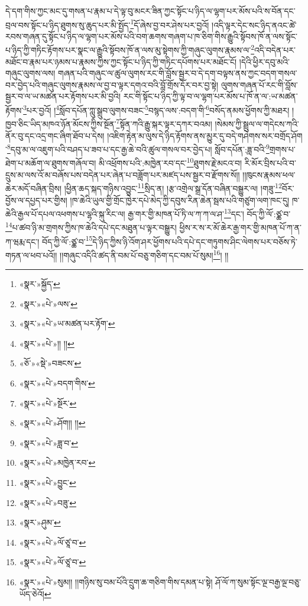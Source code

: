 དེ་དག་གིས་ཀྱང་མང་དུ་གསན་པ་རྣམ་པ་དེ་ལྟ་བུ་མངར་ཟིན་ཀྱང་སྟོང་པ་ཉིད་ལ་ལྷག་པར་མོས་པའི་ས་བོན་དང་བྲལ་བས་སྟོང་པ་ཉིད་ཐུགས་སུ་ཆུད་པར་མི་སྤྱོད་\footnote{«སྣར་»སྐྱོད་}དོ་ཞེས་བྱ་བར་ཤེས་པར་བྱའོ། །འདི་ལྟར་དེང་སང་ཉིད་ནའང་ཚེ་རབས་གཞན་དུ་སྟོང་པ་ཉིད་ལ་ལྷག་པར་མོས་པའི་བག་ཆགས་གཞག་པ་ཁ་ཅིག་གིས་རྒྱུའི་སྟོབས་ཁོ་ན་ལས་སྟོང་པ་ཉིད་ཀྱི་གཏིང་རྟོགས་པར་སྣང་ལ་རྒྱུའི་སྟོབས་ཁོ་ན་ལས་མུ་སྟེགས་ཀྱི་གཞུང་ལུགས་རྣམས་ལ་\footnote{«སྣར་»«པེ་»ལས་}འདི་བདེན་པར་མཐོང་བ་རྣམ་པར་ཉམས་པ་རྣམས་ཀྱིས་ཀྱང་སྟོང་པ་ཉིད་ཀྱི་གཏིང་དཔོགས་པར་མཐོང་ངོ། །དེའི་ཕྱིར་དབུ་མའི་གཞུང་ལུགས་ལས། གཞན་པའི་གཞུང་ལ་ཚུལ་ལུགས་རང་གི་བློས་སྦྱར་བ་དེ་དག་བལྟས་ནས་ཀྱང་བདག་གསལ་བར་བྱེད་པའི་གཞུང་ལུགས་རྣམས་ལ་བྱ་བ་ལྟར་དགའ་བའི་བློ་གྲོས་དོར་བར་བྱ་སྟེ། ལུགས་གཞན་པོ་རང་གི་བློས་སྦྱར་བ་ལ་ཡ་མཚན་པར་རྟོགས་པར་མི་བྱའི། རང་གི་སྟོང་པ་ཉིད་ཀྱི་ལྟ་བ་ལ་ལྷག་པར་མོས་པ་ཁོ་ན་ལ་:ཡ་མཚན་རྟོགས་\footnote{«སྣར་»«པེ་»ཡ་མཚན་པར་རྟོག་}པར་བྱའོ། །\footnote{«སྣར་»«པེ་»།། །།}སློབ་དཔོན་ཀླུ་སྒྲུབ་ལུགས་བཟང་\footnote{«ཅོ་»«སྡེ་»བཟངས་}བསྙད་ལས་:བདག་གི་\footnote{«སྣར་»«པེ་»བདག་གིས་}བསོད་ནམས་ཕྱོགས་ཀྱི་མཐར། །ཁྱབ་ཅིང་ཡིད་མཁའ་ཉོན་མོངས་ཀྱིས་སྔོན་\footnote{«སྣར་»«པེ་»སྔོར་}སྟོན་ཀའི་རྒྱུ་སྐར་ལྟར་དཀར་བའམ། །སེམས་ཀྱི་སྦྲུལ་ལ་གདེངས་ཀའི་ནོར་བུ་དང་འདྲ་གང་ཞིག་ཐོབ་པ་དེས། །འཇིག་རྟེན་མ་ལུས་དེ་ཉིད་རྟོགས་ནས་མྱུར་དུ་བདེ་གཤེགས་སར་བགྲོད་ཤོག ་\footnote{«སྣར་»«པེ་»ཤོག།། །།}དབུ་མ་ལ་འཇུག་པའི་བཤད་པ་ཟབ་པ་དང་རྒྱ་ཆེ་བའི་ཚུལ་གསལ་བར་བྱེད་པ། སློབ་དཔོན་:ཟླ་བའི་\footnote{«སྣར་»«པེ་»ཟླ་བ་}གྲགས་པ་ཐེག་པ་མཆོག་ལ་ཐུགས་གཞོལ་བ། མི་འཕྲོགས་པའི་:མཁྱེན་རབ་དང་\footnote{«སྣར་»«པེ་»མཁྱེན་རབ་}ཐུགས་རྗེ་མངའ་བ། རི་མོར་བྲིས་པའི་བ་དྲུས་མ་ལས་འོ་མ་བཞོས་པས་བདེན་པར་ཞེན་པ་བཟློག་པར་མཛད་པས་སྦྱར་བ་རྫོགས་སོ།། །།ཁུངས་རྣམས་ཕལ་ཆེར་མདོ་བཞིན་བྲིས། །ཕྱིན་ཆད་སྐད་གཉིས་འབྱུང་\footnote{«སྣར་»«པེ་»བྱུང་}སྲིད་ན། །རྩ་འགྲེལ་སྒྲ་དོན་བཞིན་བསྒྱུར་ལ། །གཟུ་\footnote{«སྣར་»«པེ་»བཟུ་}བོར་བྱོས་ལ་དཔྱད་པར་གྱིས། །ཁ་ཆེའི་ཡུལ་གྱི་གྲོང་ཁྱེར་དཔེ་མེད་ཀྱི་དབུས་རིན་ཆེན་སྦས་པའི་གཙུག་ལག་ཁང་དུ། ཁ་ཆེའི་རྒྱལ་པོ་དཔལ་འཕགས་པ་ལྷའི་སྐུ་རིང་ལ། རྒྱ་གར་གྱི་མཁན་པོ་ཏི་ལ་ཀ་ཀ་ལ་ཤ་\footnote{«སྣར་»ཤུམ་}དང་། བོད་ཀྱི་ལོ་:ཙྪ་བ་\footnote{«སྣར་»«པེ་»ལོ་ཙཱ་བ་}པ་ཚབ་ཉི་མ་གྲགས་ཀྱིས་ཁ་ཆེའི་དཔེ་དང་མཐུན་པ་ལྟར་བསྒྱུར། ཕྱིས་ར་ས་ར་མོ་ཆེར་རྒྱ་གར་གྱི་མཁན་པོ་ཀ་ན་ཀ་ཝརྨ་དང་། བོད་ཀྱི་ལོ་:ཙྪ་བ་\footnote{«སྣར་»«པེ་»ལོ་ཙཱ་བ་}དེ་ཉིད་ཀྱིས་ཉི་འོག་ཤར་ཕྱོགས་པའི་དཔེ་དང་གཏུགས་ཤིང་ལེགས་པར་བཅོས་ཏེ་གཏན་ལ་ཕབ་པའོ།། །།གཞུང་འདིའི་ཚད་ནི་བམ་པོ་བཅུ་གཅིག་དང་བམ་པོ་སུམ།\footnote{«སྣར་»«པེ་»སུམ།། །།གཉིས་སུ་བམ་པོའི་དྲུག་ཆ་གཅིག་གིས་དམན་པ་སྟེ། ཤོ་ལོ་ཀ་སུམ་སྟོང་ལྔ་བརྒྱ་ལྔ་བཅུ་ཡོད་ཅེའོ།}། །།